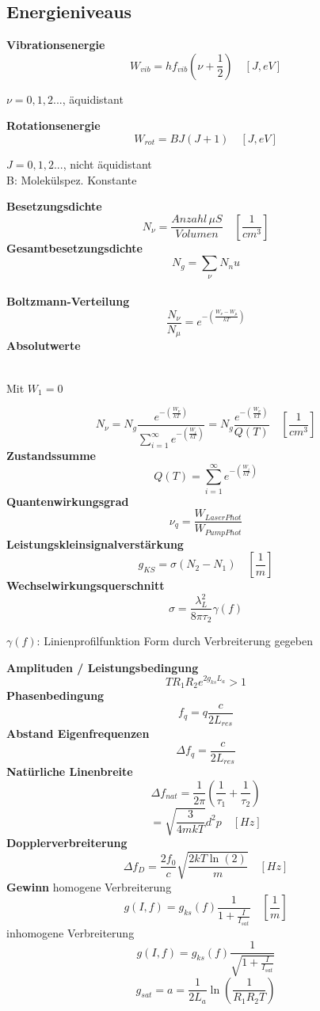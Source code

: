 \documentclass[12pt,a4paper,oneside]{article}
\begin{document}
\subsection*{Energieniveaus}
\begin{multicols}{2}
\textbf{Vibrationsenergie} $$W_{vib}=h f_{vib} (\nu + \frac{1}{2}) \quad [J, eV]$$\begin{tiny}$\nu = 0, 1, 2... $, äquidistant\\
\end{tiny} 
\textbf{Rotationsenergie} $$W_{rot}= B J (J+1)\quad [J, eV]$$ \begin{tiny}$J=0,1,2...$, nicht äquidistant \\B: Molekülspez. Konstante\\
\end{tiny}
\textbf{Besetzungsdichte} $$N_\nu = \frac{Anzahl \, \mu S}{Volumen} \quad [\frac{1}{cm^3}]$$
\textbf{Gesamtbesetzungsdichte} $$N_g = \sum_\nu N_nu$$\\
\textbf{Boltzmann-Verteilung }$$\frac{N_\nu}{N_\mu}=e^{-(\frac{W_\nu-W_\mu}{kT})}$$
\textbf{Absolutwerte} \begin{tiny}\\Mit $W_1 = 0$
\end{tiny}$$N_\nu = N_g \frac{e^{-(\frac{W_\nu}{kT})}}{ \sum_{i=1}^{\infty} e^{-(\frac{W_i}{kT})}} =N_g \frac{e^{-(\frac{W_\nu}{kT})}}{ Q(T)} \quad [\frac{1}{cm^3}]$$
\textbf{Zustandssumme} $$Q(T) = \sum_{i=1}^{\infty} e^{-(\frac{W_i}{kT})} $$
\textbf{Quantenwirkungsgrad} $$\nu_q = \frac{W_{LaserPhot}}{W_{PumpPhot}}$$
\textbf{Leistungskleinsignalverstärkung} $$g_{KS}=\sigma(N_2-N_1)\quad[\frac{1}{m}]$$
\textbf{Wechselwirkungsquerschnitt} $$\sigma= \frac{\lambda_L^2}{8 \pi \tau_2}\gamma(f)$$\begin{tiny}$\gamma(f)$: Linienprofilfunktion Form durch Verbreiterung gegeben\\
\end{tiny}
\textbf{Amplituden / Leistungsbedingung }$$ T R_1 R_2 e^{2 g_{ks} L_a}>1$$
\textbf{Phasenbedingung} $$f_q = q \frac{c}{2 L_{res}} $$
\textbf{Abstand Eigenfrequenzen }$$\Delta f_q = \frac{c}{2 L_{res}}$$
\textbf{Natürliche Linenbreite} $$ \Delta f_{nat} = \frac{1}{2 \pi}(\frac{1}{\tau_1}+ \frac{1}{\tau_2}) $$ $$= \sqrt{\frac{3}{4 m k T}}d^2 p  \quad [Hz]$$
\textbf{Dopplerverbreiterung} $$\Delta f_{D}=\frac{2 f_0}{c}\sqrt{\frac{2 k T \ln(2)}{m}} \quad [Hz]$$
\textbf{Gewinn} homogene Verbreiterung $$ g(I, f)=g_{ks}(f) \frac{1}{1 + \frac{I}{I_{sat}}} \quad [\frac{1}{m}]$$
inhomogene Verbreiterung $$g(I,f)= g_{ks}(f)\frac{1}{\sqrt{1+\frac{I}{I_{sat}}}}$$
$$g_{sat} = a = \frac{1}{2 L_a} \ln(\frac{1}{R_1 R_2 T})$$
\end{multicols}
\end{document}

